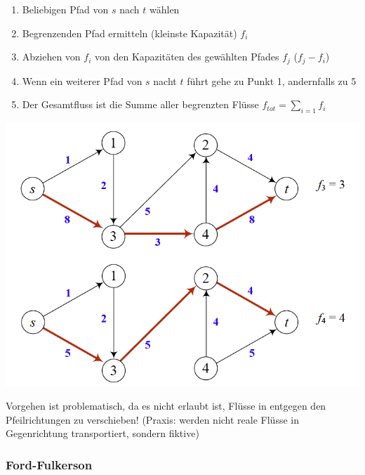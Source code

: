 \begin{minipage}{0.7\textwidth}
	\begin{enumerate}
		\item Beliebigen Pfad von $s$ nach $t$ wählen
		\item Begrenzenden Pfad ermitteln (kleinste Kapazität) $f_i$
		\item Abziehen von $f_i$ von den Kapazitäten des gewählten Pfades $f_j$ ($f_j-f_i$)
		\item Wenn ein weiterer Pfad von $s$ nacht $t$ führt gehe zu  Punkt 1, andernfalls zu 5
		\item Der Gesamtfluss ist die Summe aller begrenzten Flüsse $f_{tot} = \sum_{i=1} f_i$
	\end{enumerate}
\end{minipage}
\begin{minipage}{0.3\textwidth}
	\includegraphics[width=\textwidth]{Content/Graphen/augmentingPathMethode.png}
\end{minipage}


Vorgehen ist problematisch, da es nicht erlaubt ist, Flüsse in entgegen den Pfeilrichtungen zu verschieben! (Praxis: werden nicht reale Flüsse in Gegenrichtung transportiert, sondern fiktive)


\subsubsection{Ford-Fulkerson}

